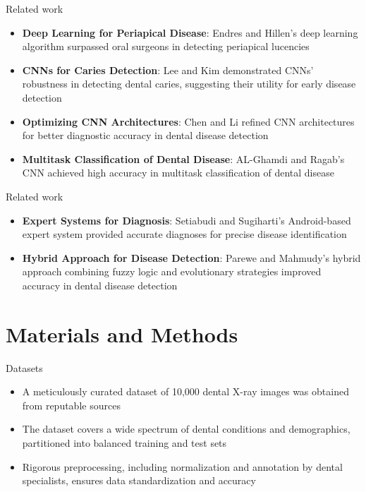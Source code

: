 \documentclass{beamer}
\begin{document}
\begin{frame}{Related work}
	\begin{itemize}
	\vfill
	\item \textbf{Deep Learning for Periapical Disease}: Endres and Hillen's deep learning algorithm surpassed oral surgeons in detecting periapical lucencies \cite{endres2020development}
	\vfill
	\item \textbf{CNNs for Caries Detection}: Lee and Kim demonstrated CNNs' robustness in detecting dental caries, suggesting their utility for early disease detection \cite{lee2018detection}
	\vfill
	\item \textbf{Optimizing CNN Architectures}: Chen and Li  refined CNN architectures for better diagnostic accuracy in dental disease detection \cite{chen2021dental}
	\vfill
	\item \textbf{Multitask Classification of Dental Disease}: AL-Ghamdi and Ragab's CNN achieved high accuracy in multitask classification of dental disease \cite{al2022detection}
	\end{itemize}
\end{frame}

\begin{frame}{Related work}
	\begin{itemize}
	\vfill
	\item \textbf{Expert Systems for Diagnosis}: Setiabudi and Sugiharti's Android-based expert system provided accurate diagnoses for precise disease identification \cite{setiabudi2017expert}
	\vfill
	\item \textbf{Hybrid Approach for Disease Detection}: Parewe and Mahmudy's hybrid approach combining fuzzy logic and evolutionary strategies improved accuracy in dental disease detection \cite{parewe2018dental}
	\end{itemize}
\end{frame}

\section[Materials and Methods]{Materials and Methods}

\begin{frame}{Datasets}
	\begin{itemize}
	\vfill
	\item A meticulously curated dataset of 10,000 dental X-ray images was obtained from reputable sources
	\vfill
	\item The dataset covers a wide spectrum of dental conditions and demographics, partitioned into balanced training and test sets
	\vfill
	\item Rigorous preprocessing, including normalization and annotation by dental specialists, ensures data standardization and accuracy
	\end{itemize}
\end{frame}
\end{document}
